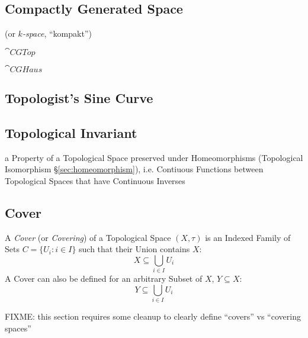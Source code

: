 \subsection{Compactly Generated Space}\label{sec:compactly_generated}

(or \emph{$k$-space}, ``kompakt'')

$\cat{CGTop}$

$\cat{CGHaus}$



\subsection{Topologist's Sine Curve}\label{sec:topologists_sine}

\subsection{Topological Invariant}\label{sec:topological_invariant}

a Property of a Topological Space preserved under Homeomorphisms
(Topological Isomorphism \S\ref{sec:homeomorphism}), i.e. Contiuous Functions
between Topological Spaces that have Continuous Inverses



\subsection{Cover}\label{sec:topological_cover}

A \emph{Cover} (or \emph{Covering}) of a Topological Space $(X, \tau)$
is an Indexed Family of Sets $C = \{ U_i : i \in I \}$ such that their
Union contains $X$:
\[
  X \subseteq \bigcup_{i \in I} U_i
\]
A Cover can also be defined for an arbitrary Subset of $X$, $Y
\subseteq X$:
\[
  Y \subseteq \bigcup_{i \in I} U_i
\]

FIXME: this section requires some cleanup to clearly define ``covers''
vs ``covering spaces''

